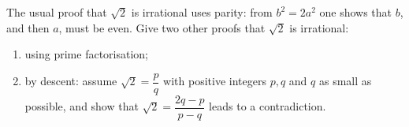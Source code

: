 The usual proof that $\sqrt2$ is irrational uses parity: from $b^2=2a^2$ one shows that $b$, and then $a$, must be even. Give two other proofs that $\sqrt2$ is irrational:
\begin{enumerate}
\item[(a)] using prime factorisation;
\item[(b)] by descent: assume $\sqrt2=\dfrac {p}{q}$ with positive integers $p,q$ and $q$ as small as possible, and show that $\sqrt2=\dfrac{2q-p}{p-q}$ leads to a contradiction.
\end{enumerate}
